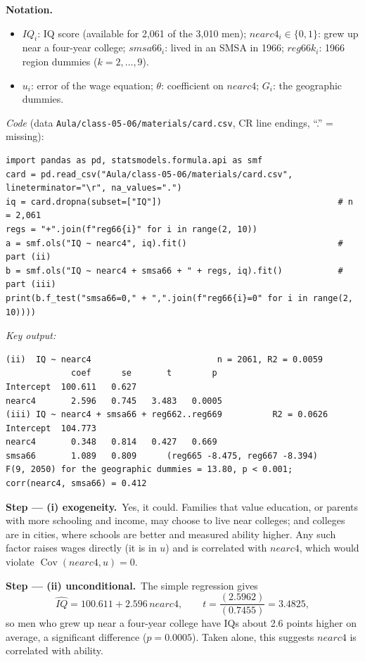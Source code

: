 \documentclass[11pt,a4paper]{article}
\newenvironment{notacao}{\par\smallskip\noindent\textbf{Notation.}\begin{itemize}[leftmargin=1.4em,topsep=1pt,itemsep=0pt]\small}{\end{itemize}}
\newcommand{\passo}[2]{\par\smallskip\noindent\textbf{Step --- #1.}~#2}
\begin{document}
\begin{sol}
\begin{notacao}
\item $IQ_i$: IQ score (available for 2,061 of the 3,010 men); $nearc4_i\in\{0,1\}$: grew up near a
four-year college; $smsa66_i$: lived in an SMSA in 1966; $reg66k_i$: 1966 region dummies ($k=2,\dots,9$).
\item $u_i$: error of the wage equation; $\theta$: coefficient on $nearc4$; $G_i$: the geographic dummies.
\end{notacao}

\noindent\textit{Code} (data \texttt{Aula/class-05-06/materials/card.csv}, CR line endings, ``.'' = missing):
\begingroup\footnotesize
\begin{verbatim}
import pandas as pd, statsmodels.formula.api as smf
card = pd.read_csv("Aula/class-05-06/materials/card.csv", lineterminator="\r", na_values=".")
iq = card.dropna(subset=["IQ"])                                   # n = 2,061
regs = "+".join(f"reg66{i}" for i in range(2, 10))
a = smf.ols("IQ ~ nearc4", iq).fit()                              # part (ii)
b = smf.ols("IQ ~ nearc4 + smsa66 + " + regs, iq).fit()           # part (iii)
print(b.f_test("smsa66=0," + ",".join(f"reg66{i}=0" for i in range(2, 10))))
\end{verbatim}
\endgroup
\noindent\textit{Key output:}
\begingroup\footnotesize
\begin{verbatim}
(ii)  IQ ~ nearc4                         n = 2061, R2 = 0.0059
             coef      se       t        p
Intercept  100.611   0.627
nearc4       2.596   0.745   3.483   0.0005
(iii) IQ ~ nearc4 + smsa66 + reg662..reg669          R2 = 0.0626
Intercept  104.773
nearc4       0.348   0.814   0.427   0.669
smsa66       1.089   0.809      (reg665 -8.475, reg667 -8.394)
F(9, 2050) for the geographic dummies = 13.80, p < 0.001;  corr(nearc4, smsa66) = 0.412
\end{verbatim}
\endgroup

\passo{(i) exogeneity}{Yes, it could. Families that value education, or parents with more schooling and
income, may choose to live near colleges; and colleges are in cities, where schools are better and
measured ability higher. Any such factor raises wages directly (it is in $u$) and is correlated with
$nearc4$, which would violate $\operatorname{Cov}(nearc4,u)=0$.}

\passo{(ii) unconditional}{The simple regression gives
\begin{equation}
\widehat{IQ}=100.611+2.596\,nearc4,\qquad t=\frac{(2.5962)}{(0.7455)}=3.4825,\label{q7:simple}
\end{equation}
so men who grew up near a four-year college have IQs about 2.6 points higher on average, a significant
difference ($p=0.0005$). Taken alone, this suggests $nearc4$ is correlated with ability.}


\end{sol}
\end{document}
